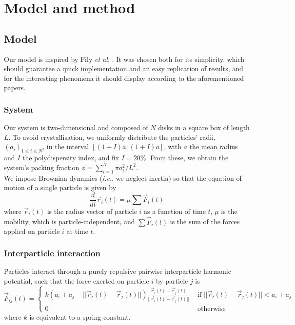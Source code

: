 \documentclass[class=report, float=false, crop=false]{standalone}
\begin{document}
\chapter{Model and method}
\label{chap:model}

\section{Model}

Our model is inspired by Fily \textit{et al.} \cite{fily2012athermal, fily2014freezing}. It was chosen both for its simplicity, which should guarantee a quick implementation and an easy replication of results, and for the interesting phenomena it should display according to the aforementioned papers.

\subsection{System}

Our system is two-dimensional and composed of $N$ disks in a square box of length $L$. To avoid crystallisation, we uniformly distribute the particles' radii, $(a_i)_{1 \leq i \leq N}$, in the interval $[(1-I)a; (1+I)a]$, with $a$ the mean radius and $I$ the polydispersity index, and fix $I=20\%$. From these, we obtain the system's packing fraction $\phi = \sum_{i=1}^N \pi a_i^2/L^2$.\\

We impose Brownian dynamics (\textit{i.e.}, we neglect inertia) so that the equation of motion of a single particle is given by
\begin{equation}
\frac{d}{dt}\vec{r}_i(t) = \mu \sum\vec{F}_i(t)
\label{brownian_dynamics}
\end{equation}
where $\vec{r}_i(t)$ is the radius vector of particle $i$ as a function of time $t$, $\mu$ is the mobility, which is particle-independent, and $\sum\vec{F}_i(t)$ is the sum of the forces applied on particle $i$ at time $t$.

\subsection{Interparticle interaction}

Particles interact through a purely repulsive pairwise interparticle harmonic potential, such that the force exerted on particle $i$ by particle $j$ is
\begin{equation}
\vec{F}_{ij}(t) = \begin{cases} k(a_i + a_j - ||\vec{r}_i(t) - \vec{r}_j(t)||)\frac{\vec{r}_i(t) - \vec{r}_j(t)}{||\vec{r}_i(t) - \vec{r}_j(t)||} &\text{ if } ||\vec{r}_i(t) - \vec{r}_j(t)|| < a_i + a_j \\ 0 &\text{ otherwise} \end{cases}
\label{interparticle_force}
\end{equation}
where $k$ is equivalent to a spring constant.\\
\end{document}
